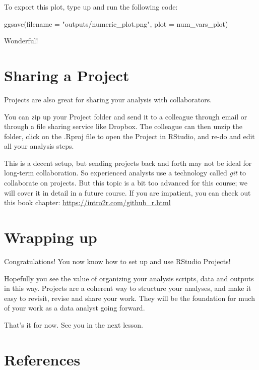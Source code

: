 \documentclass[
  letterpaper,
  DIV=11,
  numbers=noendperiod]{scrreprt}
\newenvironment{Shaded}{\begin{snugshade}}{\end{snugshade}}
\newcommand{\AttributeTok}[1]{\textcolor[rgb]{0.40,0.45,0.13}{#1}}
\newcommand{\FunctionTok}[1]{\textcolor[rgb]{0.28,0.35,0.67}{#1}}
\newcommand{\NormalTok}[1]{\textcolor[rgb]{0.00,0.23,0.31}{#1}}
\newcommand{\StringTok}[1]{\textcolor[rgb]{0.13,0.47,0.30}{#1}}
\begin{document}
To export this plot, type up and run the following code:

\begin{Shaded}
\begin{Highlighting}[]
\FunctionTok{ggsave}\NormalTok{(}\AttributeTok{filename =} \StringTok{"outputs/numeric\_plot.png"}\NormalTok{, }\AttributeTok{plot =}\NormalTok{ num\_vars\_plot)}
\end{Highlighting}
\end{Shaded}

Wonderful!

\section{Sharing a Project}\label{sharing-a-project}

Projects are also great for sharing your analysis with collaborators.

You can zip up your Project folder and send it to a colleague through
email or through a file sharing service like Dropbox. The colleague can
then unzip the folder, click on the .Rproj file to open the Project in
RStudio, and re-do and edit all your analysis steps.

This is a decent setup, but sending projects back and forth may not be
ideal for long-term collaboration. So experienced analysts use a
technology called \emph{git} to collaborate on projects. But this topic
is a bit too advanced for this course; we will cover it in detail in a
future course. If you are impatient, you can check out this book
chapter: \url{https://intro2r.com/github_r.html}

\section{Wrapping up}\label{wrapping-up-3}

Congratulations! You now know how to set up and use RStudio Projects!

Hopefully you see the value of organizing your analysis scripts, data
and outputs in this way. Projects are a coherent way to structure your
analyses, and make it easy to revisit, revise and share your work. They
will be the foundation for much of your work as a data analyst going
forward.

That's it for now. See you in the next lesson.

\section*{References}\label{references-4}
\end{document}
